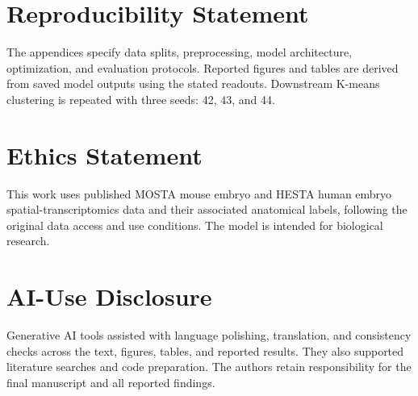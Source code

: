 \section{Reproducibility Statement}
The appendices specify data splits, preprocessing, model architecture, optimization, and evaluation protocols. Reported figures and tables are derived from saved model outputs using the stated readouts. Downstream K-means clustering is repeated with three seeds: 42, 43, and 44.

\section{Ethics Statement}
This work uses published MOSTA mouse embryo and HESTA human embryo spatial-transcriptomics data and their associated anatomical labels, following the original data access and use conditions. The model is intended for biological research.

\section{AI-Use Disclosure}
Generative AI tools assisted with language polishing, translation, and consistency checks across the text, figures, tables, and reported results. They also supported literature searches and code preparation. The authors retain responsibility for the final manuscript and all reported findings.

